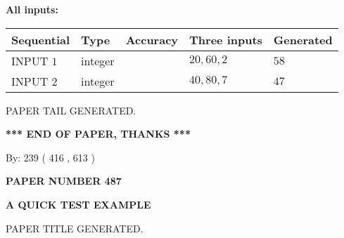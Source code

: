 \documentclass[12pt]{article}
\begin{document}
   
   
   
\noindent\vspace{0.1in}\hspace{-0.08in} {\textbf{\Large{All inputs: }}}
   
   
  
  
\noindent\begin{tabular}{|l|l|l|l|l|}
\hline
 Sequential & Type & Accuracy & Three inputs & Generated \\ 
\hline
 
 
  INPUT $  1 $ & integer &  & $
 20
 , 
 60
 , 
 2
 $ & $ 58 $ 
 \\  \hline  
 
 
  INPUT $  2 $ & integer &  & $
 40
 , 
 80
 , 
 7
 $ & $ 47 $ 
 \\  \hline  
 \end{tabular}
   
   
   
   
   
   
 \vspace{0.2in}
 
   
   
\vspace{2.0in} PAPER TAIL GENERATED.
   
   
   
   
\vspace{1.0in} 
{\textbf{\large{ *** END OF PAPER, THANKS *** }}} 
   
   
\hspace{1.0in} By: 
 239 ( 416 ,  613 )
   
   
   
   
\newpage 
\setcounter{page}{ 
   487001 } 
   
   
   
   
 {\textbf{ \Large{ PAPER NUMBER  487  }}}
   
   
\vspace{0.2in}
   
   
   
   
   
   
   
   
 \vspace{0.2in}
{\LARGE {\textbf{ A QUICK TEST EXAMPLE}}}
   
   
 PAPER TITLE GENERATED.
   
   
   
\vspace{0.2in}
   
\end{document}

